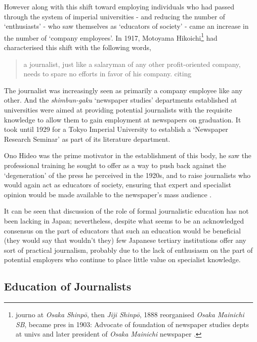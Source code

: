 \documentclass[11pt, headings=normal]{scrartcl}
\begin{document}
However along with this shift toward employing individuals who had
passed through the system of imperial universities - and reducing the
number of `enthusiasts' - who saw themselves as `educators of society' -
came an increase in the number of `company employees'. In 1917, Motoyama
Hikoichi\footnote{journo at \emph{Osaka Shinpō}, then \emph{Jiji
  Shinpō}, 1888 reorganised \emph{Osaka Mainichi SB}, became pres in
  1903: Advocate of foundation of newspaper studies depts at univs and
  later president of \emph{Osaka Mainichi} newspaper
  \autocite[36n]{Schafer:2012}.} had characterised this shift with the
following words,

\begin{quote}
a journalist, just like a salaryman of any other profit-oriented
company, needs to spare no efforts in favor of his company.
\autocite[37]{Schafer:2012} citing \autocite[52]{Ono:1971}
\end{quote}

The journalist was increasingly seen as primarily a company employee
like any other. And the \emph{shimbun-gaku} `newspaper studies'
departments established at universities were aimed at providing
potential journalists with the requisite knowledge to allow them to gain
employment at newspapers on graduation. It took until 1929 for a Tokyo
Imperial University to establish a `Newspaper Research Seminar' as part
of its literature department.\autocite[ p40]{Schafer:2012}

Ono Hideo was the prime motivator in the establishment of this body, he
saw the professional training he sought to offer as a way to push back
against the `degeneration' of the press he perceived in the 1920s, and
to raise journalists who would again act as educators of society,
ensuring that expert and specialist opinion would be made available to
the newspaper's mass audience \autocite[ p45--5]{Schafer:2012}.

It can be seen that discussion of the role of formal journalistic
education has not been lacking in Japan; nevertheless, despite what
seems to be an acknowledged consensus on the part of educators that such
an education would be beneficial (they would say that wouldn't they) few
Japanese tertiary institutions offer any sort of practical journalism,
probably due to the lack of enthusiasm on the part of potential
employers who continue to place little value on specialist knowledge.

\autocites{Huffman:1997}{Lange:1998}

\hypertarget{education-of-journalists}{%
\subsection{Education of Journalists}\label{education-of-journalists}}
\end{document}
